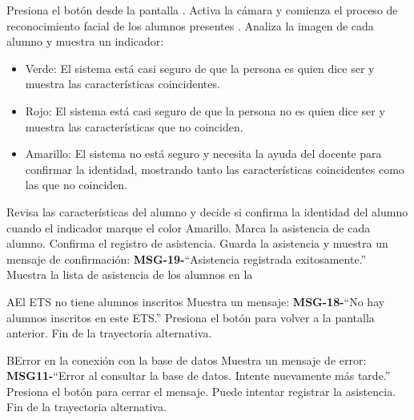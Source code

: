 \begin{UCtrayectoria}
	\UCpaso[\UCactor] Presiona el botón  desde la pantalla .
	\UCpaso Activa la cámara y comienza el proceso de reconocimiento facial de los alumnos presentes .  
	\UCpaso Analiza la imagen de cada alumno y muestra un indicador:
	\begin{itemize}
		\item Verde: El sistema está casi seguro de que la persona es quien dice ser y muestra las características coincidentes.
		\item Rojo: El sistema está casi seguro de que la persona no es quien dice ser y muestra las características que no coinciden. 
		\item Amarillo: El sistema no está seguro y necesita la ayuda del docente para confirmar la identidad, mostrando tanto las características coincidentes como las que no coinciden. 
	\end{itemize}
	\UCpaso[\UCactor] Revisa las características del alumno y decide si confirma la identidad del alumno cuando el indicador marque el color Amarillo. 
	\UCpaso Marca la asistencia de cada alumno.
	\UCpaso[\UCactor] Confirma el registro de asistencia.
	\UCpaso Guarda la asistencia y muestra un mensaje de confirmación: {\bf MSG-19-}{``Asistencia registrada exitosamente.''}
	\UCpaso Muestra la lista de asistencia de los alumnos en la 
\end{UCtrayectoria}
\begin{UCtrayectoriaA}{A}{El ETS no tiene alumnos inscritos}
	\UCpaso Muestra un mensaje: {\bf MSG-18-}{``No hay alumnos inscritos en este ETS.''}
	\UCpaso[\UCactor] Presiona el botón  para volver a la pantalla anterior.
	\UCpaso Fin de la trayectoria alternativa.
\end{UCtrayectoriaA}
\begin{UCtrayectoriaA}{B}{Error en la conexión con la base de datos}
	\UCpaso[\UCactor] Muestra un mensaje de error: {\bf MSG11-}{``Error al consultar la base de datos. Intente nuevamente más tarde.''}
	\UCpaso[\UCactor] Presiona el botón  para cerrar el mensaje.
	\UCpaso[\UCactor] Puede intentar registrar la asistencia.
	\UCpaso Fin de la trayectoria alternativa.
\end{UCtrayectoriaA}
